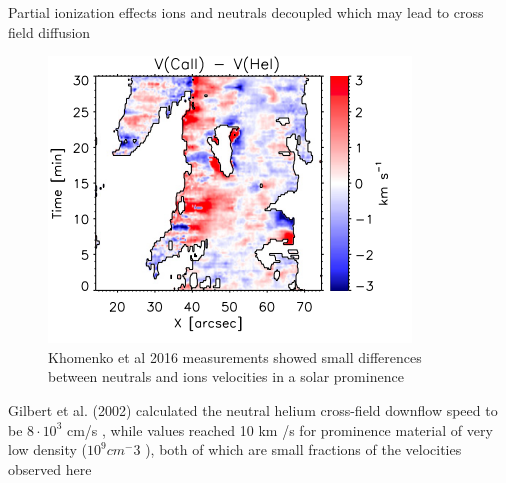 \documentclass{beamer}
\begin{document}
\begin{frame}{Partial ionization effects}
ions and neutrals decoupled which may lead to cross field diffusion

\begin{figure}[H]
 \begin{minipage}[c]{0.6\textwidth}
    \includegraphics[scale=0.45]{kh2016.png}
  \end{minipage}\hfill
  \begin{minipage}[c]{0.4\textwidth}
    \caption{
			Khomenko et al 2016 measurements showed small differences between neutrals and ions velocities in a solar prominence
    } 
  \end{minipage}
\end{figure}

Gilbert et al. (2002) calculated the neutral helium cross-field
downflow speed to be $8 \cdot 10^3$ cm/s , while values reached
10 km /s for prominence material of very low density
($10^9 cm^-3$ ), both of which are small fractions of the velocities
observed here 

\end{frame}
\end{document}

